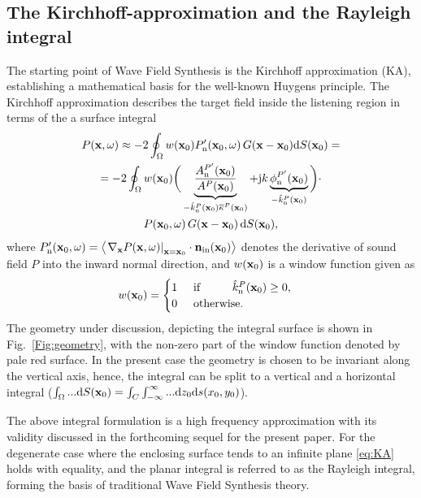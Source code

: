 \documentclass[lettersize,journal]{IEEEtran}
\begin{document}
\subsection{The Kirchhoff-approximation and the Rayleigh integral}
The starting point of Wave Field Synthesis is the Kirchhoff approximation (KA), establishing a mathematical basis for the well-known Huygens principle.
The Kirchhoff approximation describes the target field inside the listening region in terms of the a surface integral
{\fontsize{9pt}{\baselineskip}
\selectfont
\begin{multline}
  P(\mathbf{x},\omega) \approx -2 \oint_\Omega w(\mathbf{x}_0) P'_{\mathrm{n}}(\mathbf{x}_0, \omega) \, G(\mathbf{x}-\mathbf{x}_0) \mathrm{d} S(\mathbf{x}_0) = \\
  = -2 \oint_\Omega w(\mathbf{x}_0) \bigg( \underbrace{ \frac{A^{P'}_{\mathrm{n}}(\mathbf{x}_0)}{A^P(\mathbf{x}_0)} }_{-\hat{k}_\mathrm{n}^P(\mathbf{x}_0)\overline{\kappa}^P(\mathbf{x}_0)} + \mathrm{j} k \underbrace{\phi^{P'}_{\mathrm{n}}(\mathbf{x}_0)}_{-\hat{k}_\mathrm{n}^P(\mathbf{x}_0)}\bigg) \cdot \\ P(\mathbf{x}_0, \omega) \, G(\mathbf{x}-\mathbf{x}_0) \,\mathrm{d} S(\mathbf{x}_0),
  \label{eq:KA}
\end{multline}}
where $P'_{\mathrm{n}}(\mathbf{x}_0, \omega) = \left< \left. \nabla_{\mathbf{x}} P(\mathbf{x}, \omega)\right|_{\mathbf{x} = \mathbf{x}_0} \cdot \mathbf{n}_{\mathrm{in}}(\mathbf{x}_0) \right>$ denotes the derivative of sound field $P$ into the inward normal direction, and $w(\mathbf{x}_0)$ is a window function given as
\begin{equation}
  w(\mathbf{x}_0) = 
  \begin{cases}
    1  \hspace{5mm} \text{if} \hspace{1cm} \hat{k}_\mathrm{n}^P(\mathbf{x}_0)\geq 0, \\
    0   \hspace{5mm} \text{otherwise}.
  \end{cases}
\end{equation}
The geometry under discussion, depicting the integral surface is shown in Fig.~\ref{Fig:geometry}, with the non-zero part of the window function denoted by pale red surface.
In the present case the geometry is chosen to be invariant along the vertical axis, hence, the integral can be split to a vertical and a horizontal integral ($\int_\Omega ... \mathrm{d} S(\mathbf{x}_0) = \int_{C} \int_{-\infty}^{\infty} ... \mathrm{d} z_0 \mathrm{d} s(x_0,y_0)$).

The above integral formulation is a high frequency approximation with its validity discussed in the forthcoming sequel for the present paper.
For the degenerate case where the enclosing surface tends to an infinite plane \eqref{eq:KA} holds with equality, and the planar integral is referred to as the Rayleigh integral, forming the basis of traditional Wave Field Synthesis theory.
\end{document}
